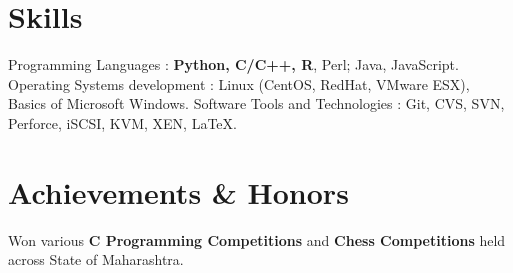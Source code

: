 \documentclass[margin,line]{res}
\newenvironment{list2}{
  \begin{list}{$\bullet$}{%
      \setlength{\itemsep}{0.05in}
      \setlength{\parsep}{0in} \setlength{\parskip}{0in}
      \setlength{\topsep}{-0.1in} \setlength{\partopsep}{0in}
      \setlength{\leftmargin}{0.2in}}}{\end{list}}
\begin{document}
\begin{resume}
\section{\sc Skills}
Programming Languages : {\bf Python, C/C++, R}, Perl; Java, JavaScript. \newline
Operating Systems development : Linux (CentOS, RedHat, VMware ESX), Basics of Microsoft Windows. \newline
Software Tools and Technologies : Git, CVS, SVN, Perforce, iSCSI, KVM, XEN, \LaTeX.

\section{\sc Achievements \& Honors}
Won various {\bf C Programming Competitions} and {\bf Chess Competitions} held across State of Maharashtra.






\end{resume}
\end{document}
